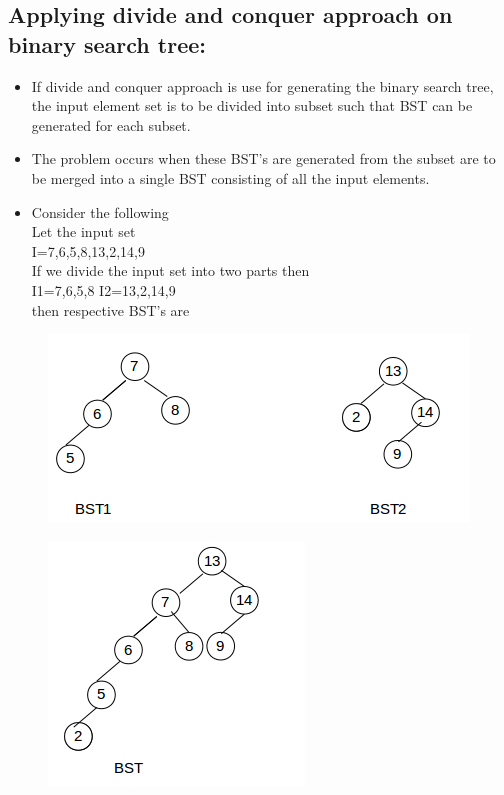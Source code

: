 \documentclass{article}
\begin{document}
	\subsection{Applying divide and conquer approach on binary search tree:}
	
	\begin{itemize}
		
		\item If divide and conquer approach is use for generating the binary search tree, the input element set is to be divided into subset such that BST can be generated for each subset.\\
		\item The problem occurs when these BST's are generated from the subset are to be merged into a single BST consisting of all the input elements.\\
		\item Consider the following \\
		Let the input set\\ 
		I={7,6,5,8,13,2,14,9}\\
		If we divide the input set into two parts then \\
		I1={7,6,5,8} I2={13,2,14,9}\\
		then respective BST's are \\
	\end{itemize}
	
	\begin{figure}[h!]
		\centering
		\includegraphics[scale=0.7]{q.png}
	\end{figure}
	\begin{figure}[h!]
		\centering
		\includegraphics[scale=0.7]{p.png}
	\end{figure}
	
\end{document}
